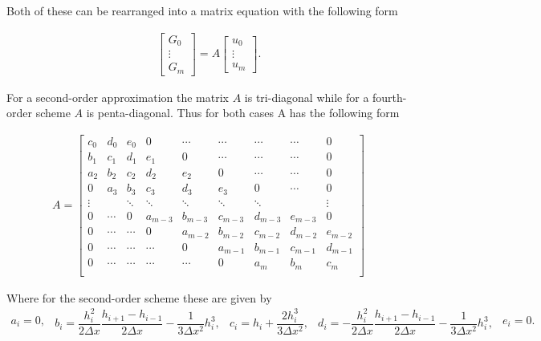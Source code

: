 \documentclass[SingleSpace,12pt]{Serre_ASCE}
\begin{document}
Both of these can be rearranged into a matrix equation with the following form 
\begin{linenomath*}
\begin{gather*}
\left[\begin{array}{c}
 G_0 \\
 \vdots \\
 G_m \end{array}\right]
 = A \left[\begin{array}{c}
  u_0 \\
  \vdots \\
  u_m \end{array}\right].
\end{gather*}
\end{linenomath*}
For a second-order approximation the matrix $A$ is tri-diagonal while for a fourth-order scheme $A$ is penta-diagonal. Thus for both cases A has the following form
\begin{linenomath*}
\begin{gather*}
A =
\left[\begin{array}{ccccccccc}
 c_0 & d_0 & e_0 & 0 & \dotsm & \dotsm & \dotsm & \dotsm & 0 \\
 b_1 & c_1 & d_1 & e_1 & 0 & \dotsm & \dotsm & \dotsm & 0 \\
 a_2 & b_2 & c_2 & d_2 & e_2 & 0 & \dotsm & \dotsm & 0  \\
  0 & a_3 & b_3 & c_3 & d_3 & e_3 & 0 & \dotsm & 0  \\
 \vdots &  &\ddots &\ddots &\ddots &\ddots &\ddots &  & \vdots \\
  0 & \dotsm & 0 & a_{m-3} & b_{m-3} & c_{m-3} & d_{m-3} & e_{m-3} & 0 \\
  0 & \dotsm & \dotsm & 0 & a_{m-2} & b_{m-2} & c_{m-2} & d_{m-2} & e_{m-2} \\
  0 & \dotsm & \dotsm & \dotsm & 0 & a_{m-1} & b_{m-1} & c_{m-1} & d_{m-1} \\
  0 & \dotsm & \dotsm & \dotsm & \dotsm & 0 & a_{m} & b_{m} & c_{m}\\
  \end{array}\right]
\end{gather*}
\end{linenomath*}
Where for the second-order scheme these are given by
\begin{subequations}
\begin{gather}
a_i = 0,
\label{eq:secondoa}
\end{gather}
\begin{gather}
b_i = \dfrac{h^2_i}{2\Delta x} \dfrac{h_{i+1} - h_{i-1}}{2 \Delta x} - \dfrac{1}{3\Delta x^2} h_i^3,
\label{eq:secondob}
\end{gather}
\begin{gather}
c_i = h_i + \dfrac{2h_i^3}{3 \Delta x^2},
\label{eq:secondoc}
\end{gather}
\begin{gather}
d_i = -\dfrac{h^2_i}{2\Delta x} \dfrac{h_{i+1} - h_{i-1}}{2 \Delta x} - \dfrac{1}{3\Delta x^2} h_i^3,
\label{eq:secondod}
\end{gather}
\begin{gather}
e_i = 0.
\label{eq:secondoe}
\end{gather}
\end{subequations}
\end{document}
